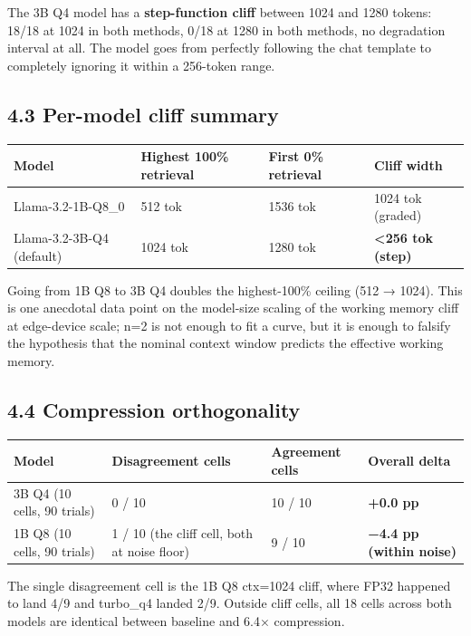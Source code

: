 \documentclass[11pt]{article}
\begin{document}
The 3B Q4 model has a \textbf{step-function cliff} between 1024 and 1280 tokens: 18/18 at 1024 in both methods, 0/18 at 1280 in both methods, no degradation interval at all. The model goes from perfectly following the chat template to completely ignoring it within a 256-token range.


\subsection*{4.3 Per-model cliff summary}


\begin{center}
\begin{tabular}{llll}
\toprule
Model & Highest 100\% retrieval & First 0\% retrieval & Cliff width \\
\midrule
Llama-3.2-1B-Q8\_0 & 512 tok & 1536 tok & 1024 tok (graded) \\
Llama-3.2-3B-Q4 (default) & 1024 tok & 1280 tok & \textbf{<256 tok (step)} \\
\bottomrule
\end{tabular}
\end{center}


Going from 1B Q8 to 3B Q4 doubles the highest-100\% ceiling (512 → 1024). This is one anecdotal data point on the model-size scaling of the working memory cliff at edge-device scale; n=2 is not enough to fit a curve, but it is enough to falsify the hypothesis that the nominal context window predicts the effective working memory.


\subsection*{4.4 Compression orthogonality}


\begin{center}
\begin{tabular}{llll}
\toprule
Model & Disagreement cells & Agreement cells & Overall delta \\
\midrule
3B Q4 (10 cells, 90 trials) & 0 / 10 & 10 / 10 & \textbf{+0.0 pp} \\
1B Q8 (10 cells, 90 trials) & 1 / 10 (the cliff cell, both at noise floor) & 9 / 10 & \textbf{−4.4 pp (within noise)} \\
\bottomrule
\end{tabular}
\end{center}


The single disagreement cell is the 1B Q8 ctx=1024 cliff, where FP32 happened to land 4/9 and turbo\_q4 landed 2/9. Outside cliff cells, all 18 cells across both models are identical between baseline and 6.4× compression.
\end{document}
